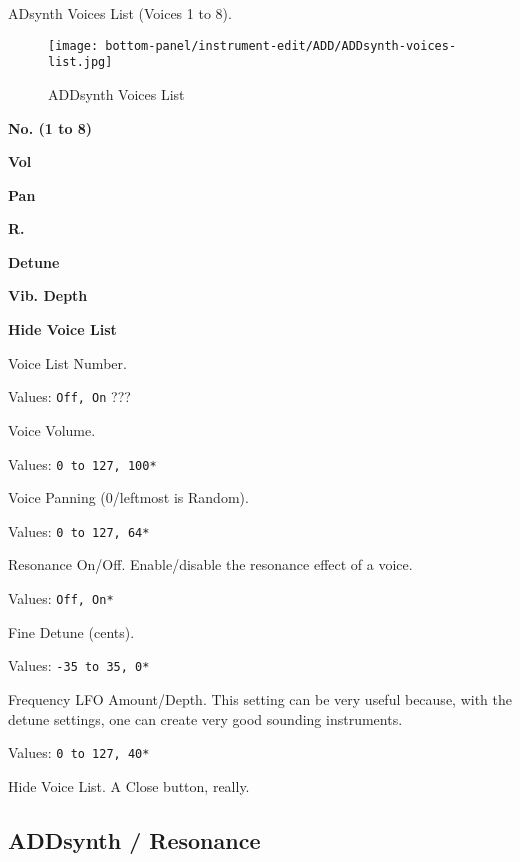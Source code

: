    ADsynth Voices List (Voices 1 to 8).

\begin{figure}[H]
   \centering 
   \texttt{[image: bottom-panel/instrument-edit/ADD/ADDsynth-voices-list.jpg]}
   \caption{ADDsynth Voices List}
   \label{fig:addsynth_voices_list}
\end{figure}

   \begin{enumber}
      \item \textbf{No. (1 to 8)}
      \item \textbf{Vol}
      \item \textbf{Pan}
      \item \textbf{R.}
      \item \textbf{Detune}
      \item \textbf{Vib. Depth}
      \item \textbf{Hide Voice List}
   \end{enumber}

   \setcounter{ItemCounter}{0}      %

   Voice List Number.

   Values: \texttt{Off, On} ???

   Voice Volume.

   Values: \texttt{0 to 127, 100*}

   Voice Panning (0/leftmost is Random).

   Values: \texttt{0 to 127, 64*}

   Resonance On/Off.
   Enable/disable the resonance effect of a voice.

   Values: \texttt{Off, On*}

   Fine Detune (cents).

   Values: \texttt{-35 to 35, 0*}

   Frequency LFO Amount/Depth.
   This setting can be very useful because, with the detune settings, one can
   create very good sounding instruments. 

   Values: \texttt{0 to 127, 40*}

   Hide Voice List.  A Close button, really.

\subsection{ADDsynth / Resonance}
\label{subsec:addsynth_resonance}

